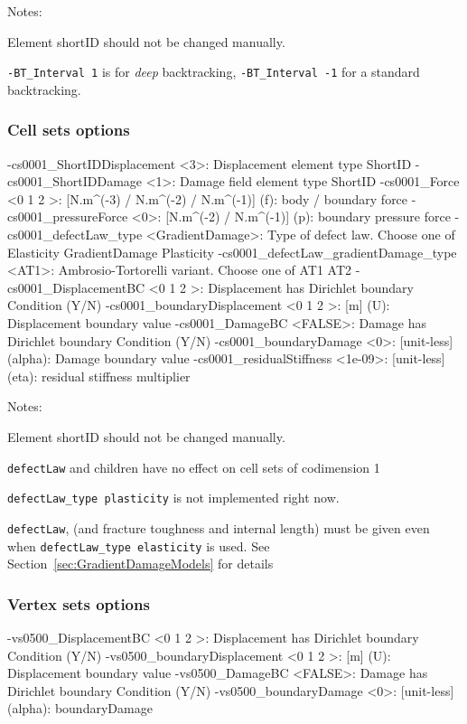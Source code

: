 \documentclass[10pt,oneside]{memoir}
\begin{document}
Notes:
\begin{compactenum}
\item Element shortID should not be changed manually. 
\item \verb+-BT_Interval 1+ is for \emph{deep} backtracking, \verb+-BT_Interval -1+ for a standard backtracking.
\end{compactenum}

\subsubsection{Cell sets options}
\small{\begin{boxedverbatim}
-cs0001_ShortIDDisplacement <3>: Displacement element type ShortID 
-cs0001_ShortIDDamage <1>: Damage field element type ShortID 
-cs0001_Force <0 1 2 >: [N.m^(-3) / N.m^(-2) / N.m^(-1)] (f): body / boundary force 
-cs0001_pressureForce <0>: [N.m^(-2) / N.m^(-1)] (p): boundary pressure force 
-cs0001_defectLaw_type <GradientDamage>: Type of defect law. Choose one of 
                                         Elasticity GradientDamage Plasticity
-cs0001_defectLaw_gradientDamage_type <AT1>: Ambrosio-Tortorelli variant. 
                                             Choose one of AT1 AT2
-cs0001_DisplacementBC <0 1 2 >: Displacement has Dirichlet boundary Condition (Y/N) 
-cs0001_boundaryDisplacement <0 1 2 >: [m] (U): Displacement boundary value 
-cs0001_DamageBC <FALSE>: Damage has Dirichlet boundary Condition (Y/N) 
-cs0001_boundaryDamage <0>: [unit-less] (alpha): Damage boundary value 
-cs0001_residualStiffness <1e-09>: [unit-less] (eta): residual stiffness multiplier 
\end{boxedverbatim}}
Notes:
\begin{compactenum}
\item Element shortID should not be changed manually.
\item \verb+defectLaw+ and children have no effect on cell sets of codimension 1
\item \verb+defectLaw_type plasticity+ is not implemented right now.
\item \verb+defectLaw+, (and fracture toughness and internal length) must be given even when \verb+defectLaw_type elasticity+ is used. See Section~\ref{sec:GradientDamageModels} for details
\end{compactenum}


\subsubsection{Vertex sets options}
\small{\begin{boxedverbatim}
-vs0500_DisplacementBC <0 1 2 >: Displacement has Dirichlet boundary Condition (Y/N) 
-vs0500_boundaryDisplacement <0 1 2 >: [m] (U): Displacement boundary value 
-vs0500_DamageBC <FALSE>: Damage has Dirichlet boundary Condition (Y/N) 
-vs0500_boundaryDamage <0>: [unit-less] (alpha): boundaryDamage 
\end{boxedverbatim}}
\end{document}
